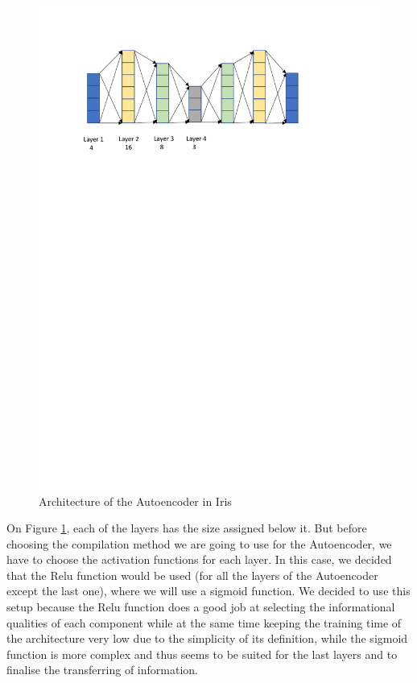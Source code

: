 \documentclass[12pt]{report}
\begin{document}
\begin{figure}[H]
	\centering
	\includegraphics[width=17cm]{Figuras_tfg/Autoencoder_Results}
	\caption{Architecture of the Autoencoder in Iris}
	\label{fig:figure_autoencoder_Iris}
\end{figure}

On Figure \ref{fig:figure_autoencoder_Iris}, each of the layers has the size assigned below it. But before choosing the compilation method we are going to use for the Autoencoder, we have to choose the activation functions for each layer. In this case, we decided that the Relu function would be used (for all the layers of the Autoencoder except the last one), where we will use a sigmoid function. We decided to use this setup because the Relu function does a good job at selecting the informational qualities of each component while at the same time keeping the training time of the architecture very low due to the simplicity of its definition, while the sigmoid function is more complex and thus seems to be suited for the last layers and to finalise the transferring of information. \par
\end{document}
